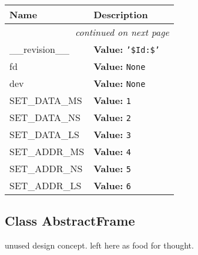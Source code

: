 \begin{longtable}{|p{}|p{}|l}
\cline{1-2}
\cline{1-2} \centering \textbf{Name} & \centering \textbf{Description}& \\
\cline{1-2}
\endhead\cline{1-2}\multicolumn{3}{r}{\small\textit{continued on next page}}\\\endfoot\cline{1-2}
\endlastfoot\raggedright \_\-\_\-r\-e\-v\-i\-s\-i\-o\-n\-\_\-\_\- & \textbf{Value:} 
{\tt '\-\$\-I\-d\-:\-\$\-'\-}&\\
\cline{1-2}
\raggedright f\-d\- & \textbf{Value:} 
{\tt N\-o\-n\-e\-}&\\
\cline{1-2}
\raggedright d\-e\-v\- & \textbf{Value:} 
{\tt N\-o\-n\-e\-}&\\
\cline{1-2}
\raggedright S\-E\-T\-\_\-D\-A\-T\-A\-\_\-M\-S\- & \textbf{Value:} 
{\tt 1\-}&\\
\cline{1-2}
\raggedright S\-E\-T\-\_\-D\-A\-T\-A\-\_\-N\-S\- & \textbf{Value:} 
{\tt 2\-}&\\
\cline{1-2}
\raggedright S\-E\-T\-\_\-D\-A\-T\-A\-\_\-L\-S\- & \textbf{Value:} 
{\tt 3\-}&\\
\cline{1-2}
\raggedright S\-E\-T\-\_\-A\-D\-D\-R\-\_\-M\-S\- & \textbf{Value:} 
{\tt 4\-}&\\
\cline{1-2}
\raggedright S\-E\-T\-\_\-A\-D\-D\-R\-\_\-N\-S\- & \textbf{Value:} 
{\tt 5\-}&\\
\cline{1-2}
\raggedright S\-E\-T\-\_\-A\-D\-D\-R\-\_\-L\-S\- & \textbf{Value:} 
{\tt 6\-}&\\
\cline{1-2}
\end{longtable}



\subsection{Class AbstractFrame}

    \label{ociw:AbstractFrame}
unused design concept. left here as food for thought.



